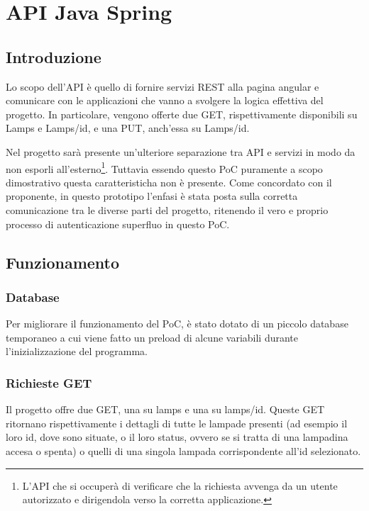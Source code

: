 \chapter{API Java Spring}\label{funzionamento}

\section{Introduzione}

Lo scopo dell'API è quello di fornire servizi REST alla pagina angular e comunicare con le applicazioni che vanno a svolgere la logica effettiva del progetto. In particolare, vengono offerte due GET, rispettivamente disponibili su Lamps e Lamps/id, e una PUT, anch'essa su Lamps/id.

Nel progetto sarà presente un'ulteriore separazione tra API e servizi in modo da non esporli all'esterno\footnote{L'API che si occuperà di verificare che la richiesta avvenga da un utente autorizzato e dirigendola verso la corretta applicazione.}. Tuttavia essendo questo PoC puramente a scopo dimostrativo questa caratteristicha non è presente. Come concordato con il proponente, in questo prototipo l'enfasi è stata posta sulla corretta comunicazione tra le diverse parti del progetto, ritenendo il vero e proprio processo di autenticazione superfluo in questo PoC.

\section{Funzionamento}

\subsection{Database}

Per migliorare il funzionamento del PoC, è stato dotato di un piccolo database temporaneo a cui viene fatto un preload di alcune variabili durante l'inizializzazione del programma.

\subsection{Richieste GET}

Il progetto offre due GET, una su lamps e una su lamps/id. Queste GET ritornano rispettivamente i dettagli di tutte le lampade presenti (ad esempio il loro id, dove sono situate, o il loro status, ovvero se si tratta di una lampadina accesa o spenta) o quelli di una singola lampada corrispondente all'id selezionato.

